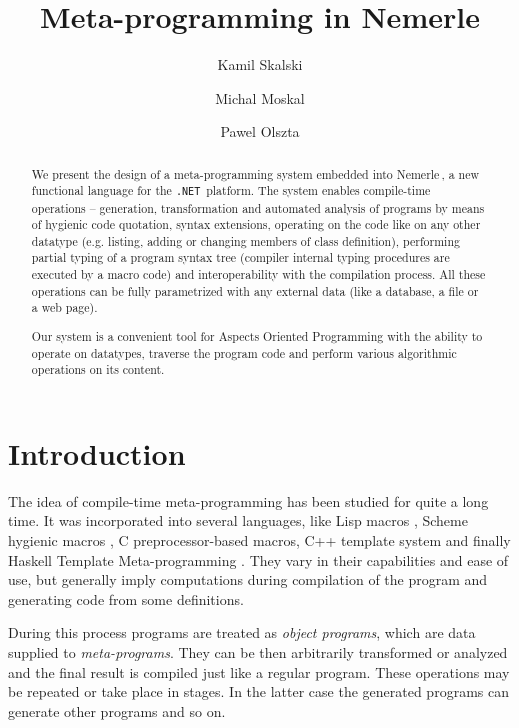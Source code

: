 \documentclass{llncs}
\newcommand{\net}[0]{{\tt .NET}}
\newcommand{\nem}[0]{Nemerle}
\begin{document}
%
\frontmatter          %
%
\pagestyle{headings}  %
%
\title{Meta-programming in \nem}
%
%
\author{Kamil Skalski \and Michal Moskal \and Pawel Olszta}
%
%
%
%
\maketitle              %
%
\begin{abstract}
We present the design of a meta-programming system embedded into \nem\,,
a new functional language for the \net\ platform. The system enables
compile-time operations -- generation, transformation and automated 
analysis of programs by means of hygienic code quotation, syntax 
extensions, operating on the code like on any other datatype (e.g. listing, 
adding or changing members of class definition), performing partial 
typing of a program syntax tree (compiler internal typing procedures 
are executed by a macro code) and interoperability with the compilation 
process. All these operations can be fully parametrized with any 
external data (like a database, a file or a web page).

Our system is a convenient tool for Aspects Oriented Programming with 
the ability to operate on datatypes, traverse the program code and perform 
various algorithmic operations on its content.
\end{abstract}

\section{Introduction}
The idea of compile-time meta-programming has been studied for quite a long time.
It was incorporated into several languages, like Lisp macros \cite{Lisp:Macros}, 
Scheme hygienic macros \cite{Scheme:Macros}, C preprocessor-based macros, 
C++ template system and finally 
Haskell Template Meta-programming \cite{Haskell:Meta}. 
They vary in their capabilities and ease of use, but generally imply computations 
during compilation of the program and generating code from some definitions.

During this process programs are treated as \emph{object programs}, which are 
data supplied to \emph{meta-programs}. They can be then arbitrarily transformed or 
analyzed and the final result is compiled just like a regular program. These
operations may be repeated or take place in stages. In the latter case the 
generated programs can generate other programs and so on.
\end{document}
